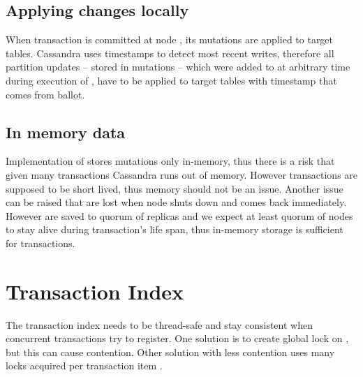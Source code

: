 \subsection{Applying changes locally}
When transaction \transaction is committed at node , its mutations are applied to target tables.
Cassandra uses timestamps to detect most recent writes, therefore all partition updates -- stored in mutations -- 
which were added to \txStorage at arbitrary time during execution of \transaction, have to be applied to target tables with timestamp that comes from \paxos ballot.



\subsection{In memory data}
Implementation of \txStorage stores mutations \mutations only in-memory, thus there is a risk that given many transactions Cassandra runs out of memory. However transactions are supposed to be short lived, thus memory should not be an issue.
Another issue can be raised that \mutations are lost when node shuts down and comes back immediately. 
However \mutations are saved to quorum of replicas and we expect at least quorum of nodes to stay alive during transaction’s life span, thus in-memory storage is sufficient for transactions.


\section{Transaction Index}
The transaction index \txIndex needs to be thread-safe and stay consistent when concurrent transactions try to register. One solution is to create global lock on \txIndex, but this can cause contention. Other solution with less contention uses many locks acquired per transaction item \txItem.

